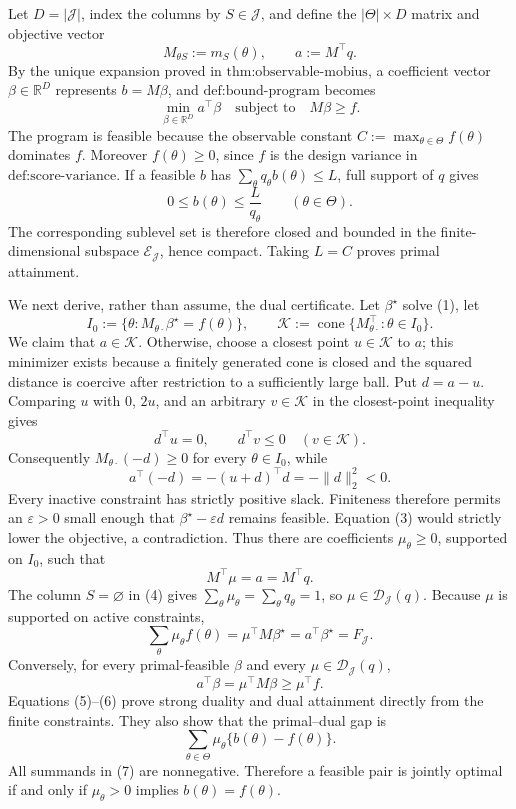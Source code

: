 Let \(D=|\mathcal J|\), index the columns by \(S\in\mathcal J\), and define the \(|\Theta|\times D\) matrix and objective vector
\[
 M_{\theta S}:=m_S(\theta),\quad\quad a:=M^\top q.
\]
By the unique expansion proved in \(\text{thm:observable-mobius}\), a coefficient vector \(\beta\in\mathbb R^D\) represents \(b=M\beta\), and \(\text{def:bound-program}\) becomes
\[
 \min_{\beta\in\mathbb R^D}a^\top\beta
 \quad\text{subject to}\quad M\beta\ge f. \tag{1}
\]
The program is feasible because the observable constant \(C:=\max_{\theta\in\Theta}f(\theta)\) dominates \(f\).  Moreover \(f(\theta)\ge0\), since \(f\) is the design variance in \(\text{def:score-variance}\).  If a feasible \(b\) has \(\sum_\theta q_\theta b(\theta)\le L\), full support of \(q\) gives
\[
 0\le b(\theta)\le \frac{L}{q_\theta}\quad\quad(\theta\in\Theta). \tag{2}
\]
The corresponding sublevel set is therefore closed and bounded in the finite-dimensional subspace \(\mathcal E_{\mathcal J}\), hence compact.  Taking \(L=C\) proves primal attainment.

We next derive, rather than assume, the dual certificate.  Let \(\beta^\star\) solve (1), let
\[
 I_0:=\{\theta:M_{\theta\cdot}\beta^\star=f(\theta)\},
 \quad\quad
 \mathcal K:=\operatorname{cone}\{M_{\theta\cdot}^{\top}:\theta\in I_0\}.
\]
We claim that \(a\in\mathcal K\).  Otherwise, choose a closest point \(u\in\mathcal K\) to \(a\); this minimizer exists because a finitely generated cone is closed and the squared distance is coercive after restriction to a sufficiently large ball.  Put \(d=a-u\).  Comparing \(u\) with \(0\), \(2u\), and an arbitrary \(v\in\mathcal K\) in the closest-point inequality gives
\[
 d^\top u=0,\quad\quad d^\top v\le0\quad(v\in\mathcal K).
\]
Consequently \(M_{\theta\cdot}(-d)\ge0\) for every \(\theta\in I_0\), while
\[
 a^\top(-d)=-(u+d)^\top d=-\|d\|_2^2<0. \tag{3}
\]
Every inactive constraint has strictly positive slack.  Finiteness therefore permits an \(\varepsilon>0\) small enough that \(\beta^\star-\varepsilon d\) remains feasible.  Equation (3) would strictly lower the objective, a contradiction.  Thus there are coefficients \(\mu_\theta\ge0\), supported on \(I_0\), such that
\[
 M^\top\mu=a=M^\top q. \tag{4}
\]
The column \(S=\varnothing\) in (4) gives \(\sum_\theta\mu_\theta=\sum_\theta q_\theta=1\), so \(\mu\in\mathcal D_{\mathcal J}(q)\).  Because \(\mu\) is supported on active constraints,
\[
 \sum_\theta\mu_\theta f(\theta)
 =\mu^\top M\beta^\star
 =a^\top\beta^\star=F_{\mathcal J}. \tag{5}
\]
Conversely, for every primal-feasible \(\beta\) and every \(\mu\in\mathcal D_{\mathcal J}(q)\),
\[
 a^\top\beta=\mu^\top M\beta\ge\mu^\top f. \tag{6}
\]
Equations (5)--(6) prove strong duality and dual attainment directly from the finite constraints.  They also show that the primal--dual gap is
\[
 \sum_{\theta\in\Theta}\mu_\theta\{b(\theta)-f(\theta)\}. \tag{7}
\]
All summands in (7) are nonnegative.  Therefore a feasible pair is jointly optimal if and only if \(\mu_\theta>0\) implies \(b(\theta)=f(\theta)\).

